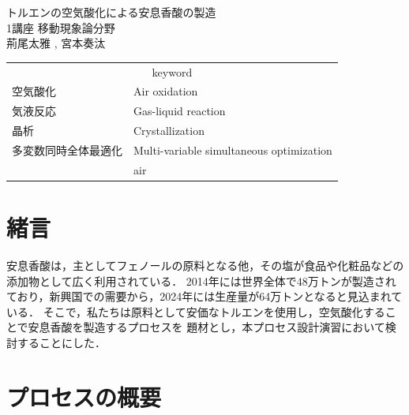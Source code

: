 \documentclass[a4j]{jsreport}
\begin{document}
\begin{titlepage}
\vspace{5cm}
\centering
{\Huge トルエンの空気酸化による安息香酸の製造}\\
\vspace{2cm}
\centering
{\Large 1講座 移動現象論分野}\\
\vspace{0.5cm}
\centering
{\large 荊尾太雅 , 宮本奏汰}\\
\vspace{3cm}
\begin{table}[htbp]
    \begin{center}
        \begin{tabular}[htbp]{ll}
            \multicolumn{2}{c}{{\LARGE keyword}}\\
            {\Large 空気酸化}&{\Large Air oxidation}\\
            {\Large 気液反応}&{\Large Gas-liquid reaction}\\
            {\Large 晶析}&{\Large Crystallization}\\
            {\Large 多変数同時全体最適化}&{\Large Multi-variable simultaneous optimization}\\
            {\Large }&{\Large air}\\
        \end{tabular}
    \end{center}
\end{table}
\end{titlepage}


\setcounter{tocdepth}{2}
\tableofcontents


\chapter{緒言}
安息香酸は，主としてフェノールの原料となる他，その塩が食品や化粧品などの添加物として広く利用されている．
2014年には世界全体で48万トンが製造されており，新興国での需要から，2024年には生産量が64万トンとなると見込まれている．
そこで，私たちは原料として安価なトルエンを使用し，空気酸化することで安息香酸を製造するプロセスを
題材とし，本プロセス設計演習において検討することにした．

\newpage
\chapter{プロセスの概要}
\end{document}
